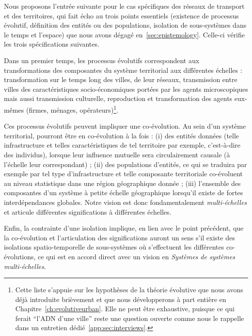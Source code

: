 Nous proposons l'entrée suivante pour le cas spécifiques des réseaux de transport et des territoires, qui fait écho au trois points essentiels (existence de processus évolutif, définition des entités ou des populations, isolation de sous-systèmes dans le temps et l'espace) que nous avons dégagé en~\ref{sec:epistemology}. Celle-ci vérifie les trois spécifications suivantes.

Dans un premier temps, les processus évolutifs correspondent aux transformations des composantes du système territorial aux différentes échelles : transformation sur le temps long des villes, de leur réseaux, transmission entre villes des caractéristiques socio-économiques portées par les agents microscopiques mais aussi transmission culturelle, reproduction et transformation des agents eux-mêmes (firmes, ménages, opérateurs)\footnote{Cette liste s'appuie sur les hypothèses de la théorie évolutive que nous avons déjà introduite brièvement et que nous développerons à part entière en Chapitre~\ref{ch:evolutiveurban}. Elle ne peut être exhaustive, puisque ce qui ferait ``l'ADN d'une ville'' reste une question ouverte comme nous le rappelle  dans un entretien dédié~\ref{app:sec:interviews}.}.

Ces processus évolutifs peuvent impliquer une co-évolution. Au sein d'un système territorial, pourront être en co-évolution à la fois : (i) des entités données (telle infrastructure et telles caractéristiques de tel territoire par exemple, c'est-à-dire des individus), lorsque leur influence mutuelle sera circulairement causale (à l'échelle leur correspondant) ; (ii) des populations d'entités, ce qui se traduira par exemple par tel type d'infrastructure et telle composante territoriale co-évoluent au niveau statistique dans une région géographique donnée ; (iii) l'ensemble des composantes d'un système à petite échelle géographique lorsqu'il existe de fortes interdépendances globales. Notre vision est donc fondamentalement \emph{multi-échelles} et articule différentes significations à différentes échelles.


Enfin, la contrainte d'une isolation implique, en lien avec le point précédent, que la co-évolution et l'articulation des significations auront un sens s'il existe des isolations spatio-temporelle de sous-systèmes où s'effectuent les différentes co-évolutions, ce qui est en accord direct avec un vision en \emph{Systèmes de systèmes multi-échelles}.


